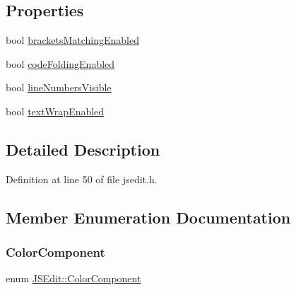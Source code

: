 \subsection*{Properties}
\begin{DoxyCompactItemize}
\item 
bool \hyperlink{class_j_s_edit_a0092eb93228a3d44df101f741a667686}{brackets\+Matching\+Enabled}
\item 
bool \hyperlink{class_j_s_edit_a1442cc5f36a78e5a26e1a88d6b78033d}{code\+Folding\+Enabled}
\item 
bool \hyperlink{class_j_s_edit_a5a9f728fcf999d5ff0ef5e3d315d269d}{line\+Numbers\+Visible}
\item 
bool \hyperlink{class_j_s_edit_afb27dea3fe4766b77f9f4f2e1c489e56}{text\+Wrap\+Enabled}
\end{DoxyCompactItemize}


\subsection{Detailed Description}


Definition at line 50 of file jsedit.\+h.



\subsection{Member Enumeration Documentation}
\mbox{\label{class_j_s_edit_a5a465193a1344e5be9b04f5ff7883213}} 
\subsubsection{\texorpdfstring{Color\+Component}{ColorComponent}}
{\footnotesize\ttfamily enum \hyperlink{class_j_s_edit_a5a465193a1344e5be9b04f5ff7883213}{J\+S\+Edit\+::\+Color\+Component}}

